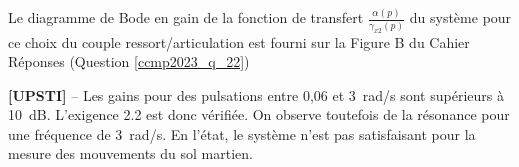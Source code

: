 Le diagramme de Bode en gain de la fonction de transfert $\frac{\alpha(p)}{\gamma_{x 2}(p)}$ du système pour ce choix du couple ressort/articulation est fourni sur la Figure B du Cahier Réponses (Question \ref{ccmp2023_q_22})

\ifprof
\begin{corrige}
\textbf{[UPSTI]} --
Les gains pour des pulsations entre 0,06 et \SI{3}{rad/s} sont supérieurs à \SI{10}{dB}. L’exigence 2.2 est donc vérifiée. On observe toutefois de la résonance pour une fréquence de \SI{3}{rad/s}. En l’état, le système n’est pas satisfaisant pour la mesure des mouvements du sol martien.
\end{corrige}
\else
\fi
